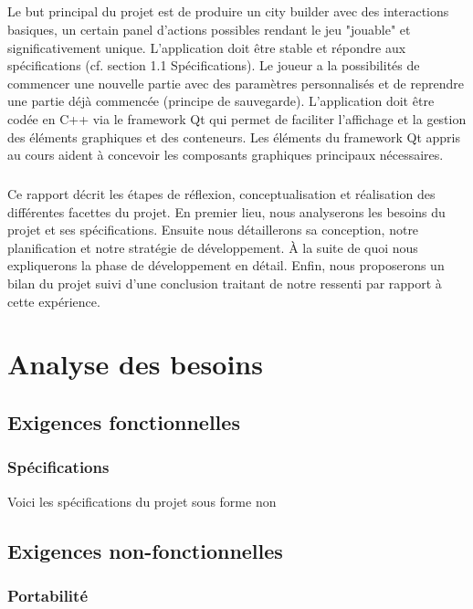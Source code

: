 \documentclass[a4paper,10pt,openany,oneside]{report}
\begin{document}
\paragraph{}
Le but principal du projet est de produire un city builder avec des interactions basiques, un certain panel d'actions possibles rendant le jeu "jouable" et significativement unique. L'application doit être stable et répondre aux spécifications (cf. section 1.1 Spécifications). Le joueur a la possibilités de commencer une nouvelle partie avec des paramètres personnalisés et de reprendre une partie déjà commencée (principe de sauvegarde). L'application doit être codée en C++ via le framework Qt qui permet de faciliter l'affichage et la gestion des éléments graphiques et des conteneurs. Les éléments du framework Qt appris au cours aident à concevoir les composants graphiques principaux nécessaires.
\paragraph{}
Ce rapport décrit les étapes de réflexion, conceptualisation et réalisation des différentes facettes du projet. En premier lieu, nous analyserons les besoins du projet et ses spécifications. Ensuite nous détaillerons sa conception, notre planification et notre stratégie de développement. À la suite de quoi nous expliquerons la phase de développement en détail. Enfin, nous proposerons un bilan du projet suivi d'une conclusion traitant de notre ressenti par rapport à cette expérience.

\chapter{Analyse des besoins}
\thispagestyle{headings}
\section{Exigences fonctionnelles}
\subsection{Spécifications}
Voici les spécifications du projet sous forme non 
\section{Exigences non-fonctionnelles}
\subsection{Portabilité}
\end{document}
